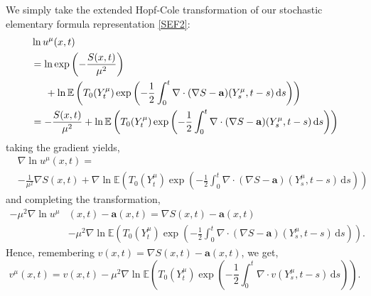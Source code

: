 \documentclass[a4paper,12pt,draft]{report}
\begin{document}
{
We simply take the extended Hopf-Cole transformation of our stochastic elementary formula representation \eqref{SEF2}:
\begin{align}
& \ln u^\mu(x, t)\nonumber\\
& = \ln\exp\left(-\frac{S(x, t)}{\mu^2}\right)\nonumber\\
& \hspace{0.5cm} + \ln\mathbb{E}\left(T_0(Y_t^\mu)\exp\left(-\frac{1}{2}\int_0^t\nabla\cdot(\nabla S - \mathbf{a})(Y_s^\mu, t - s)\,\mathrm{d}s\right)\right)\nonumber\\
& = -\frac{S(x, t)}{\mu^2} + \ln\mathbb{E}\left(T_0(Y_t^\mu)\exp\left(-\frac{1}{2}\int_0^t\nabla\cdot(\nabla S - \mathbf{a})(Y_s^\mu, t - s)\,\mathrm{d}s\right)\right)\nonumber
\end{align}
taking the gradient yields,
\begin{align}
& \nabla\ln u^\mu(x, t) = \nonumber\\
& -\frac{1}{\mu^2}\nabla S(x, t) + \nabla\ln\mathbb{E}\left(T_0(Y_t^\mu)\exp\left(-\frac{1}{2}\int_0^t\nabla\cdot(\nabla S - \mathbf{a})(Y_s^\mu, t - s)\,\mathrm{d}s\right)\right)\nonumber
\end{align}
and completing the transformation,
\begin{align}
-\mu^2\nabla\ln u^\mu & (x, t) - \mathbf{a}(x, t) = \nabla S(x, t) - \mathbf{a}(x, t)\nonumber\\
& - \mu^2\nabla\ln\mathbb{E}\left(T_0(Y_t^\mu)\exp\left(-\frac{1}{2}\int_0^t\nabla\cdot(\nabla S - \mathbf{a})(Y_s^\mu, t - s)\,\mathrm{d}s\right)\right).\nonumber
\end{align}
Hence, remembering $v(x, t) = \nabla S(x, t) - \mathbf{a}(x, t)$, we get,
$$
v^\mu(x, t) = v(x, t) - \mu^2\nabla\ln\mathbb{E}\left(T_0(Y_t^\mu)\exp\left(-\frac{1}{2}\int_0^t\nabla\cdot v(Y_s^\mu, t - s)\,\mathrm{d}s\right)\right).
$$

\qedhere
}
\end{document}
